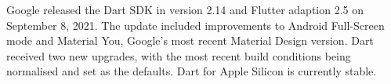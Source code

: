 Google released the Dart SDK in version 2.14 and Flutter adaption 2.5 on September 8, 2021. The update included improvements to Android Full-Screen mode and Material You, Google's most recent Material Design version. Dart received two new upgrades, with the most recent build conditions being normalised and set as the defaults. Dart for Apple Silicon is currently stable.
